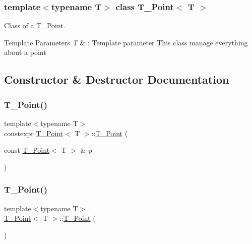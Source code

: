 \subsubsection*{template$<$typename T$>$\newline
class T\+\_\+\+Point$<$ T $>$}

Class of a \hyperlink{classT__Point}{T\+\_\+\+Point}. 


\begin{DoxyTemplParams}{Template Parameters}
{\em T} & \+: Template parameter This class manage everything about a point \\
\hline
\end{DoxyTemplParams}


\subsection{Constructor \& Destructor Documentation}
\mbox{\label{classT__Point_af313da04154273b9a75d66e9950359ea}} 
\subsubsection{\texorpdfstring{T\+\_\+\+Point()}{T\_Point()}\hspace{0.1cm}{\footnotesize\ttfamily [1/7]}}
{\footnotesize\ttfamily template$<$typename T$>$ \\
constexpr \hyperlink{classT__Point}{T\+\_\+\+Point}$<$ T $>$\+::\hyperlink{classT__Point}{T\+\_\+\+Point} (\begin{DoxyParamCaption}\item[{const \hyperlink{classT__Point}{T\+\_\+\+Point}$<$ T $>$ \&}]{p }\end{DoxyParamCaption})\hspace{0.3cm}{\ttfamily [default]}}

\mbox{\label{classT__Point_a61017b12d3c2aa88a242dbbc57733413}} 
\subsubsection{\texorpdfstring{T\+\_\+\+Point()}{T\_Point()}\hspace{0.1cm}{\footnotesize\ttfamily [2/7]}}
{\footnotesize\ttfamily template$<$typename T$>$ \\
\hyperlink{classT__Point}{T\+\_\+\+Point}$<$ T $>$\+::\hyperlink{classT__Point}{T\+\_\+\+Point} (\begin{DoxyParamCaption}{ }\end{DoxyParamCaption})\hspace{0.3cm}{\ttfamily [inline]}}



